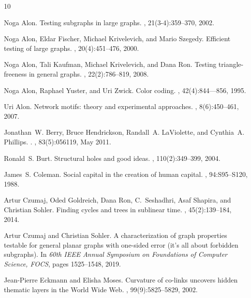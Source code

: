\documentclass{article}
\begin{document}

\begin{thebibliography}{10}

Noga Alon.
\newblock Testing subgraphs in large graphs.
, 21(3-4):359--370, 2002.

Noga Alon, Eldar Fischer, Michael Krivelevich, and Mario Szegedy.
\newblock Efficient testing of large graphs.
, 20(4):451--476, 2000.

Noga Alon, Tali Kaufman, Michael Krivelevich, and Dana Ron.
\newblock Testing triangle-freeness in general graphs.
, 22(2):786--819, 2008.

Noga Alon, Raphael Yuster, and Uri Zwick.
\newblock Color coding.
, 42(4):844--–856, 1995.

Uri Alon.
\newblock Network motifs: theory and experimental approaches.
, 8(6):450--461, 2007.

Jonathan~W. {Berry}, Bruce {Hendrickson}, Randall~A. {LaViolette}, and
  Cynthia~A. {Phillips}.
.
, 83(5):056119, May 2011.

Ronald~S. Burt.
\newblock Structural holes and good ideas.
, 110(2):349--399, 2004.

James~S. Coleman.
\newblock Social capital in the creation of human capital.
, 94:S95--S120, 1988.

Artur Czumaj, Oded Goldreich, Dana Ron, C.~Seshadhri, Asaf Shapira, and
  Christian Sohler.
\newblock Finding cycles and trees in sublinear time.
, 45(2):139--184, 2014.

Artur Czumaj and Christian Sohler.
\newblock A characterization of graph properties testable for general planar
  graphs with one-sided error (it's all about forbidden subgraphs).
\newblock In {\em 60th {IEEE} Annual Symposium on Foundations of Computer
  Science, {FOCS}}, pages 1525--1548, 2019.

Jean-Pierre Eckmann and Elisha Moses.
\newblock Curvature of co-links uncovers hidden thematic layers in the {World
  Wide Web}.
,
  99(9):5825--5829, 2002.


\end{thebibliography}
\end{document}
